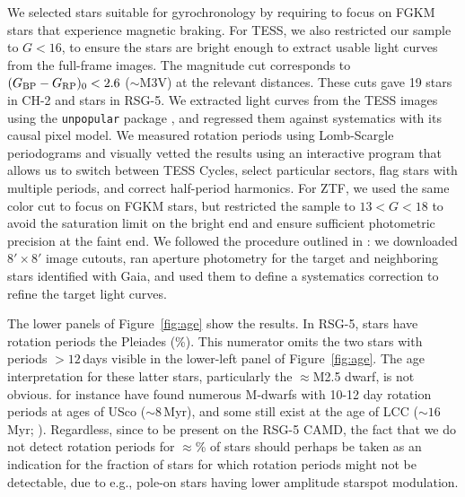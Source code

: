 \documentclass[12pt,twocolumn,tighten,linenumbers]{aastex63}
\newcommand{\bpmrpo}{(G_{\rm BP}-G_{\rm RP})_0}
\begin{document}
We selected stars suitable for gyrochronology by requiring 
\replaced{$\bpmrpo \geq 0.5$}{$\bpmrpo \geq 0.6$} to focus on FGKM stars that experience magnetic
braking.
For TESS, we also restricted our sample to $G<16$, to ensure the stars
are bright enough to extract usable light curves from the full-frame
images.  The magnitude cut corresponds to $\bpmrpo < 2.6$
($\sim$M3V) at the relevant distances.  These cuts gave 19 stars in
CH-2 and  stars in RSG-5.  We extracted light curves from the TESS
images using the \texttt{unpopular} package \citep{hattorio_2021_cpm},
and regressed them against systematics with its causal pixel model.
We measured rotation periods using Lomb-Scargle periodograms and
visually vetted the results using an interactive program that allows
us to switch between TESS Cycles, select particular sectors, flag
stars with multiple periods, and correct half-period harmonics. For
ZTF, we used the same color cut to focus on FGKM stars, but restricted
the sample to $13 < G < 18$ to avoid the saturation limit on the
bright end and ensure sufficient photometric precision at the faint
end. We followed the procedure outlined in \citet{curtis_rup147_2020}:
we downloaded $8'\times8'$ image cutouts, ran aperture photometry for
the target and neighboring stars identified with Gaia, and used them
to define a systematics correction to refine the target light curves. 

The lower panels of Figure~\ref{fig:age} show the results.  In RSG-5,
 stars have rotation periods  the Pleiades (\%).  This
numerator omits the two stars with periods $>$$12$\,days visible in
the lower-left panel of Figure~\ref{fig:age}.  The age interpretation
for these latter stars, particularly the $\approx$M2.5 dwarf, is not
obvious.  \citet{rebull_usco_2018} for instance have found numerous
M-dwarfs with 10-12 day rotation periods at ages of USco
($\sim$$8$\,Myr), and some  still exist at the age of
LCC ($\sim$$16$\,Myr; ).  Regardless, since
 to be present on the RSG-5 CAMD,
the fact
that we do not detect rotation periods for $\approx$\%
of stars should perhaps be taken as an indication for the fraction of
stars for which rotation periods might not be detectable, due to
{e.g.}, pole-on stars having lower amplitude starspot modulation.
\end{document}
